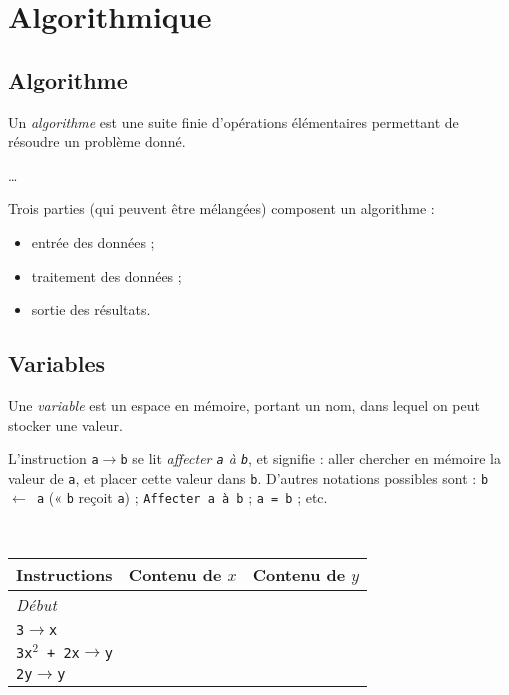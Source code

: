 \chapter{Algorithmique}
\section{Algorithme}

\begin{definition}
  Un \emph{algorithme} est une suite finie d'opérations élémentaires permettant
  de résoudre un problème donné.
\end{definition}

\begin{exemple}
  \ldots
\end{exemple}

Trois parties (qui peuvent être mélangées) composent un algorithme :
\begin{itemize}
  \item entrée des données ;
  \item traitement des données ;
  \item sortie des résultats.
\end{itemize}

\section{Variables}

\begin{definition}
  Une \emph{variable} est un espace en mémoire, portant un nom, dans lequel on
  peut stocker une valeur.
\end{definition}

L'instruction \texttt{a$\rightarrow$b} se lit \emph{affecter \texttt{a} à
\texttt{b}}, et signifie : aller chercher en mémoire la valeur de \verb+a+, et
placer cette valeur dans \verb+b+. D'autres notations possibles sont :
  \texttt{b $\leftarrow$ a} (« \verb+b+ reçoit \verb+a+) ;
  \texttt{Affecter a à b} ;
  \texttt{a = b} ;
  etc.


\begin{exemple}~
  \begin{center}
  \begin{tabular}{p{8em}|cc}
    Instructions & Contenu de $x$ & Contenu de $y$ \\
    \hline
    \emph{Début} &   &   \\
    \texttt{3$\rightarrow$x} &   &  \\
    \texttt{3x$^2$ + 2x$\rightarrow$y} &   & \\
    \texttt{2y$\rightarrow$y} & &
  \end{tabular}
\end{center}
\end{exemple}


